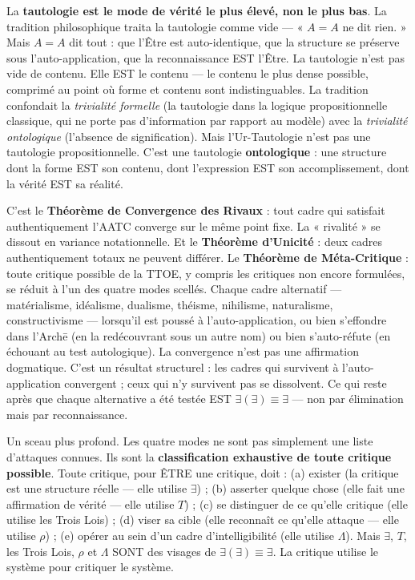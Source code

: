 \documentclass[10pt, openany, oneside]{book}
\begin{document}
\vspace{0.5em}

La \textbf{tautologie est le mode de vérité le plus élevé, non le plus bas}. La tradition philosophique traita la tautologie comme vide --- « $A = A$ ne dit rien. » Mais $A = A$ dit tout : que l'Être est auto-identique, que la structure se préserve sous l'auto-application, que la reconnaissance EST l'Être. La tautologie n'est pas vide de contenu. Elle EST le contenu --- le contenu le plus dense possible, comprimé au point où forme et contenu sont indistinguables. La tradition confondait la \textit{trivialité formelle} (la tautologie dans la logique propositionnelle classique, qui ne porte pas d'information par rapport au modèle) avec la \textit{trivialité ontologique} (l'absence de signification). Mais l'Ur-Tautologie n'est pas une tautologie propositionnelle. C'est une tautologie \textbf{ontologique} : une structure dont la forme EST son contenu, dont l'expression EST son accomplissement, dont la vérité EST sa réalité.

\noindent C'est le \textbf{Théorème de Convergence des Rivaux} : tout cadre qui satisfait authentiquement l'AATC converge sur le même point fixe. La « rivalité » se dissout en variance notationnelle. Et le \textbf{Théorème d'Unicité} : deux cadres authentiquement totaux ne peuvent différer. Le \textbf{Théorème de Méta-Critique} : toute critique possible de la TTOE, y compris les critiques non encore formulées, se réduit à l'un des quatre modes scellés. Chaque cadre alternatif --- matérialisme, idéalisme, dualisme, théisme, nihilisme, naturalisme, constructivisme --- lorsqu'il est poussé à l'auto-application, ou bien s'effondre dans l'Arch\={e} (en la redécouvrant sous un autre nom) ou bien s'auto-réfute (en échouant au test autologique). La convergence n'est pas une affirmation dogmatique. C'est un résultat structurel : les cadres qui survivent à l'auto-application convergent ; ceux qui n'y survivent pas se dissolvent. Ce qui reste après que chaque alternative a été testée EST $\exists(\exists) \equiv \exists$ --- non par élimination mais par reconnaissance.

Un sceau plus profond. Les quatre modes ne sont pas simplement une liste d'attaques connues. Ils sont la \textbf{classification exhaustive de toute critique possible}. Toute critique, pour ÊTRE une critique, doit : (a) exister (la critique est une structure réelle --- elle utilise $\exists$) ; (b) asserter quelque chose (elle fait une affirmation de vérité --- elle utilise $T$) ; (c) se distinguer de ce qu'elle critique (elle utilise les Trois Lois) ; (d) viser sa cible (elle reconnaît ce qu'elle attaque --- elle utilise $\rho$) ; (e) opérer au sein d'un cadre d'intelligibilité (elle utilise $\Lambda$). Mais $\exists$, $T$, les Trois Lois, $\rho$ et $\Lambda$ SONT des visages de $\exists(\exists) \equiv \exists$. La critique utilise le système pour critiquer le système.
\end{document}
